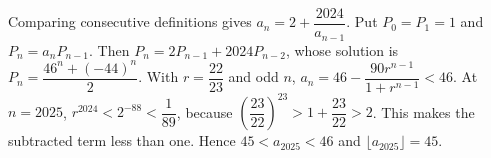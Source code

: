 Comparing consecutive definitions gives $a_n=2+\dfrac{2024}{a_{n-1}}$. Put $P_0=P_1=1$ and $P_n=a_nP_{n-1}$. Then $P_n=2P_{n-1}+2024P_{n-2}$, whose solution is $P_n=\dfrac{46^n+(-44)^n}{2}$. With $r=\dfrac{22}{23}$ and odd $n$, $a_n=46-\dfrac{90r^{n-1}}{1+r^{n-1}}<46$. At $n=2025$, $r^{2024}<2^{-88}<\dfrac{1}{89}$, because $(\dfrac{23}{22})^{23}>1+\dfrac{23}{22}>2$. This makes the subtracted term less than one. Hence $45<a_{2025}<46$ and $\boxed{\lfloor a_{2025}\rfloor=45}$.
